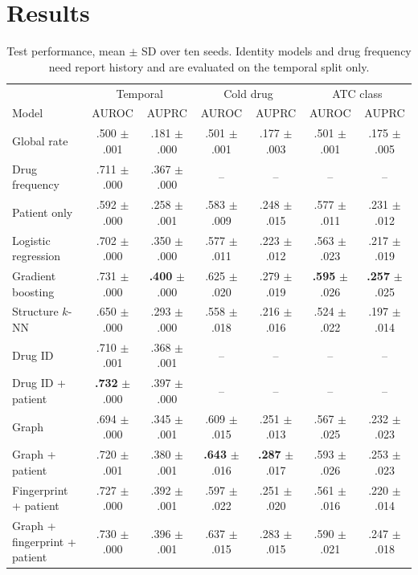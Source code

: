 \documentclass[conference,letterpaper]{IEEEtran}
\begin{document}
\section{Results}
\begin{table}[t]
\centering
\caption{Test performance, mean $\pm$ SD over ten seeds. Identity models and drug frequency need report history and are evaluated on the temporal split only.}
\label{tab:main}
\footnotesize
\begin{tabular}{lcccccc}
\toprule
 & \multicolumn{2}{c}{Temporal} & \multicolumn{2}{c}{Cold drug} & \multicolumn{2}{c}{ATC class} \\
Model & AUROC & AUPRC & AUROC & AUPRC & AUROC & AUPRC \\
\midrule
Global rate & .500 $\pm$ .001 & .181 $\pm$ .000 & .501 $\pm$ .001 & .177 $\pm$ .003 & .501 $\pm$ .001 & .175 $\pm$ .005 \\
Drug frequency & .711 $\pm$ .000 & .367 $\pm$ .000 & -- & -- & -- & -- \\
Patient only & .592 $\pm$ .000 & .258 $\pm$ .001 & .583 $\pm$ .009 & .248 $\pm$ .015 & .577 $\pm$ .011 & .231 $\pm$ .012 \\
Logistic regression & .702 $\pm$ .000 & .350 $\pm$ .000 & .577 $\pm$ .011 & .223 $\pm$ .012 & .563 $\pm$ .023 & .217 $\pm$ .019 \\
Gradient boosting & .731 $\pm$ .000 & \textbf{.400} $\pm$ .000 & .625 $\pm$ .020 & .279 $\pm$ .019 & \textbf{.595} $\pm$ .026 & \textbf{.257} $\pm$ .025 \\
Structure $k$-NN & .650 $\pm$ .000 & .293 $\pm$ .000 & .558 $\pm$ .018 & .216 $\pm$ .016 & .524 $\pm$ .022 & .197 $\pm$ .014 \\
Drug ID & .710 $\pm$ .001 & .368 $\pm$ .001 & -- & -- & -- & -- \\
Drug ID + patient & \textbf{.732} $\pm$ .000 & .397 $\pm$ .000 & -- & -- & -- & -- \\
Graph & .694 $\pm$ .000 & .345 $\pm$ .001 & .609 $\pm$ .015 & .251 $\pm$ .013 & .567 $\pm$ .025 & .232 $\pm$ .023 \\
Graph + patient & .720 $\pm$ .001 & .380 $\pm$ .001 & \textbf{.643} $\pm$ .016 & \textbf{.287} $\pm$ .017 & .593 $\pm$ .026 & .253 $\pm$ .023 \\
Fingerprint + patient & .727 $\pm$ .000 & .392 $\pm$ .001 & .597 $\pm$ .022 & .251 $\pm$ .020 & .561 $\pm$ .016 & .220 $\pm$ .014 \\
Graph + fingerprint + patient & .730 $\pm$ .000 & .396 $\pm$ .001 & .637 $\pm$ .015 & .283 $\pm$ .015 & .590 $\pm$ .021 & .247 $\pm$ .018 \\
\bottomrule
\end{tabular}
\end{table}
\end{document}
